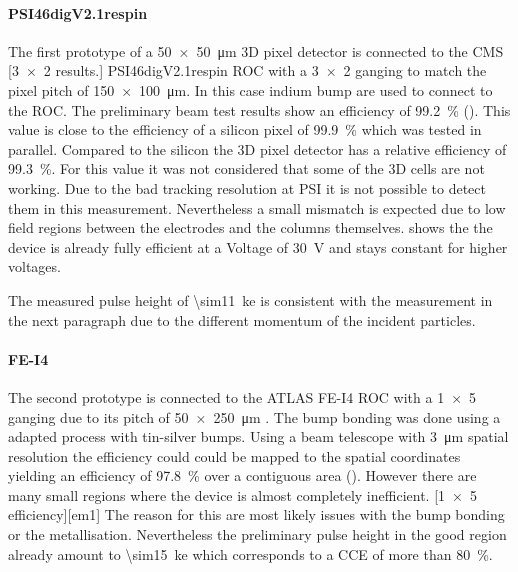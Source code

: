 \paragraph{PSI46digV2.1respin}
The first prototype of a \SI{50x50}{\micro\meter} 3D pixel detector is connected to the CMS
[\SI{3x2}{} results.]
PSI46digV2.1respin \ac{ROC} \cite{kornmayer} with a \SI{3x2}{} ganging to match the pixel pitch of \SI{150x100}{\micro\meter}. In this case indium bump are used to connect to the \ac{ROC}. %
The preliminary beam test results show an efficiency of \SI{99.2}{\%} (). This value is close to the efficiency of a silicon pixel of \SI{99.9}{\%} which was tested in parallel. Compared to the silicon the 3D pixel detector has a relative efficiency of \SI{99.3}{\%}. For this value it was not considered that some of the 3D cells are not working. Due to the bad tracking resolution at \ac{PSI} it is not possible to detect them in this measurement. Nevertheless a small mismatch is expected due to low field regions between the electrodes and the columns themselves.  shows the the device is already fully efficient at a Voltage of \SI{30}{\volt} and stays constant for higher voltages.\par
The measured pulse height of \SI{\sim11}{\kilo e} is consistent with the measurement in the next paragraph due to the different momentum of the incident particles. 

\paragraph{FE-I4}
The second prototype is connected to the ATLAS FE-I4 \ac{ROC} \cite{fei4}
with a \SI{1x5}{} ganging due to its pitch of \SI{50x250}{\micro\meter} . The bump bonding was done using a adapted process with tin-silver bumps. Using a beam telescope with \SI{3}{\micro\meter} spatial resolution the efficiency could could be mapped to the spatial coordinates yielding an efficiency of \SI{97.8}{\%} over a contiguous area (). However there are many small regions where the device is almost completely inefficient. 
[\SI{1x5}{} efficiency][em1]
The reason for this are most likely issues with the bump bonding or the metallisation. Nevertheless the preliminary pulse height in the good region already amount to \SI{\sim15}{\kilo e} which corresponds to a \ac{CCE} of more than \SI{80}{\%}. 
